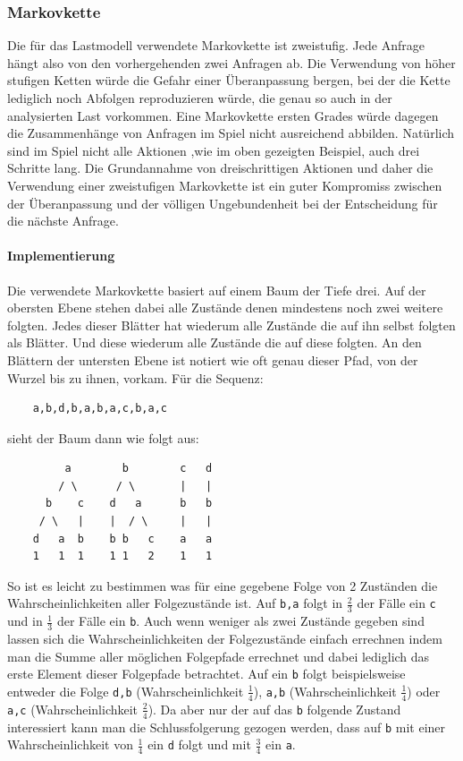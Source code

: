 \documentclass[10pt]{scrartcl}
\begin{document}
  \subsubsection{Markovkette}
  Die für das Lastmodell verwendete Markovkette ist zweistufig. Jede Anfrage hängt also von den vorhergehenden zwei Anfragen ab. Die Verwendung von höher stufigen Ketten würde die Gefahr einer Überanpassung bergen, bei der die Kette lediglich noch Abfolgen reproduzieren würde, die genau so auch in der analysierten Last vorkommen. Eine Markovkette ersten Grades würde dagegen die Zusammenhänge von Anfragen im Spiel nicht ausreichend abbilden. Natürlich sind im Spiel nicht alle Aktionen ,wie im oben gezeigten Beispiel, auch drei Schritte lang. Die Grundannahme von dreischrittigen Aktionen und daher die Verwendung einer zweistufigen Markovkette ist ein guter Kompromiss zwischen der Überanpassung und der völligen Ungebundenheit bei der Entscheidung für die nächste Anfrage.
  
  \paragraph{Implementierung}
  \label{par:markov_implementation}
  Die verwendete Markovkette basiert auf einem Baum der Tiefe drei. Auf der obersten Ebene stehen dabei alle Zustände denen mindestens noch zwei weitere folgten. Jedes dieser Blätter hat wiederum alle Zustände die auf ihn selbst folgten als Blätter. Und diese wiederum alle Zustände die auf diese folgten. An den Blättern der untersten Ebene ist notiert wie oft genau dieser Pfad, von der Wurzel bis zu ihnen, vorkam. Für die Sequenz:
  
  \begin{verbatim}
    a,b,d,b,a,b,a,c,b,a,c
  \end{verbatim}
  
  sieht der Baum dann wie folgt aus:
  
  \begin{verbatim}
         a        b        c   d
        / \      / \       |   |
      b    c    d   a      b   b
     / \   |    |  / \     |   |
    d   a  b    b b   c    a   a
    1   1  1    1 1   2    1   1
  \end{verbatim}
  
  So ist es leicht zu bestimmen was für eine gegebene Folge von 2 Zuständen die Wahrscheinlichkeiten aller Folgezustände ist. Auf \verb|b,a| folgt in $\frac{2}{3}$ der Fälle ein \verb|c| und in $\frac{1}{3}$ der Fälle ein \verb|b|. Auch wenn weniger als zwei Zustände gegeben sind lassen sich die Wahrscheinlichkeiten der Folgezustände einfach errechnen indem man die Summe aller möglichen Folgepfade errechnet und dabei lediglich das erste Element dieser Folgepfade betrachtet. Auf ein \verb|b| folgt beispielsweise entweder die Folge \verb|d,b| (Wahrscheinlichkeit $\frac{1}{4}$), \verb|a,b| (Wahrscheinlichkeit $\frac{1}{4}$) oder \verb|a,c| (Wahrscheinlichkeit $\frac{2}{4}$). Da aber nur der auf das \verb|b| folgende Zustand interessiert kann man die Schlussfolgerung gezogen werden, dass auf \verb|b| mit einer Wahrscheinlichkeit von $\frac{1}{4}$ ein \verb|d| folgt und mit $\frac{3}{4}$ ein \verb|a|.
  
\end{document}
